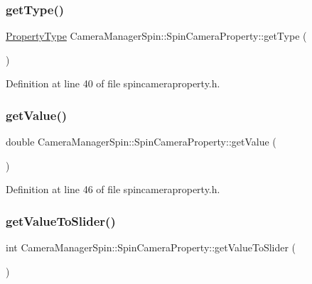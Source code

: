 \subsubsection{\texorpdfstring{getType()}{getType()}}
{\footnotesize\ttfamily \mbox{\hyperlink{namespace_camera_manager_spin_ab89e54b93aaaec5c9a411f5b6aadde0c}{Property\+Type}} Camera\+Manager\+Spin\+::\+Spin\+Camera\+Property\+::get\+Type (\begin{DoxyParamCaption}{ }\end{DoxyParamCaption})\hspace{0.3cm}{\ttfamily [inline]}}



Definition at line 40 of file spincameraproperty.\+h.

\mbox{\label{class_camera_manager_spin_1_1_spin_camera_property_a85ee3bf2a6937d74319407265aa46d55}} 
\subsubsection{\texorpdfstring{getValue()}{getValue()}}
{\footnotesize\ttfamily double Camera\+Manager\+Spin\+::\+Spin\+Camera\+Property\+::get\+Value (\begin{DoxyParamCaption}{ }\end{DoxyParamCaption})\hspace{0.3cm}{\ttfamily [inline]}}



Definition at line 46 of file spincameraproperty.\+h.

\mbox{\label{class_camera_manager_spin_1_1_spin_camera_property_ac3596199ee0af23eb01cb3d2613932a3}} 
\subsubsection{\texorpdfstring{getValueToSlider()}{getValueToSlider()}}
{\footnotesize\ttfamily int Camera\+Manager\+Spin\+::\+Spin\+Camera\+Property\+::get\+Value\+To\+Slider (\begin{DoxyParamCaption}{ }\end{DoxyParamCaption})\hspace{0.3cm}{\ttfamily [inline]}}



